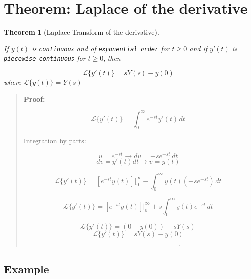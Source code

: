 \documentclass[
  letterpaper,
  DIV=11,
  numbers=noendperiod]{scrreprt}
\theoremstyle{plain}
\newtheorem{theorem}{Theorem}[chapter]
\theoremstyle{remark}
\begin{document}
\section{Theorem: Laplace of the
derivative}\label{theorem-laplace-of-the-derivative}

\begin{tcolorbox}[enhanced jigsaw, title=\textcolor{quarto-callout-note-color}{\faInfo}\hspace{0.5em}{Theorem}, colbacktitle=quarto-callout-note-color!10!white, opacitybacktitle=0.6, opacityback=0, rightrule=.15mm, breakable, titlerule=0mm, colback=white, bottomtitle=1mm, colframe=quarto-callout-note-color-frame, toprule=.15mm, leftrule=.75mm, toptitle=1mm, arc=.35mm, bottomrule=.15mm, left=2mm, coltitle=black]

\begin{theorem}[Laplace Transform of the
derivative]\protect\hypertarget{thm-LTD}{}\label{thm-LTD}

If \(y(t)\) is \texttt{continuous} and of \texttt{exponential\ order}
for \(t\geq 0\) and if \(y'(t)\) is \texttt{piecewise\ continuous} for
\(t\geq 0\), then

\[\mathscr{L}\{y'(t)\}=sY(s)-y(0)\] where \(\mathscr{L}\{y(t)\}=Y(s)\)

\end{theorem}

\begin{quote}
\textbf{Proof:}

\[\mathscr{L}\{y'(t)\}=\int_0^\infty e^{-st} y'(t)\,dt\]

Integration by parts:\footnotemark{}

\[u=e^{-st}\rightarrow du=-se^{-st}\,dt\]
\[dv=y'(t)dt\rightarrow v=y(t)\]

\[\mathscr{L}\{y'(t)\}=\left[e^{-st}y(t)\right]\Big|_0^\infty-\int_0^\infty y(t)(-se^{-st})\,dt\]

\[\mathscr{L}\{y'(t)\}=\left[e^{-st}y(t)\right]\Big|_0^\infty+s\int_0^\infty y(t)e^{-st}\,dt\]

\[\mathscr{L}\{y'(t)\}=(0-y(0))+sY(s)\]
\[\mathscr{L}\{y'(t)\}=sY(s)-y(0)\]

\[\hspace{2in}\square\]
\end{quote}

\end{tcolorbox}


\subsection{Example}\label{example-23}
\end{document}
